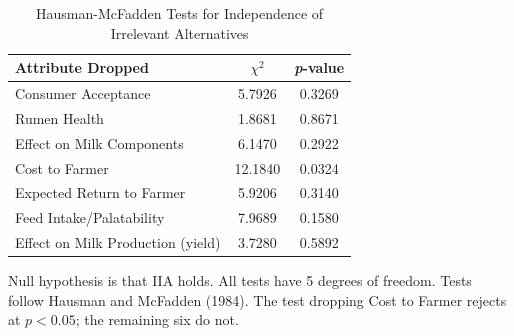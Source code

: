 \begin{table}[!h]
\centering
\caption{\label{tab:hausman}Hausman-McFadden Tests for Independence of Irrelevant Alternatives}
\centering
\begin{threeparttable}
\begin{tabular}[t]{lcc}
\toprule
Attribute Dropped & $\chi^2$ & \textit{p}-value\\
\midrule
Consumer Acceptance & 5.7926 & 0.3269\\
Rumen Health & 1.8681 & 0.8671\\
Effect on Milk Components & 6.1470 & 0.2922\\
Cost to Farmer & 12.1840 & 0.0324\\
Expected Return to Farmer & 5.9206 & 0.3140\\
\addlinespace
Feed Intake/Palatability & 7.9689 & 0.1580\\
Effect on Milk Production (yield) & 3.7280 & 0.5892\\
\bottomrule
\end{tabular}
\begin{tablenotes}
\item Null hypothesis is that IIA holds. All tests have 5 degrees of freedom. Tests follow Hausman and McFadden (1984). The test dropping Cost to Farmer rejects at $p < 0.05$; the remaining six do not.
\end{tablenotes}
\end{threeparttable}
\end{table}
